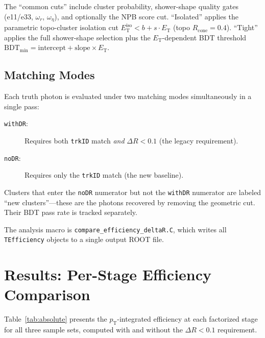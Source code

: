 \documentclass[11pt,letterpaper]{article}
\newcommand{\DR}{\ensuremath{\Delta R}}
\newcommand{\pT}{\ensuremath{p_{\text{T}}}}
\newcommand{\ET}{\ensuremath{E_{\text{T}}}}
\newcommand{\Rcone}{\ensuremath{R_{\text{cone}}}}
\begin{document}
The ``common cuts'' include cluster probability, shower-shape quality gates
(e11/e33, $\omega_r$, $\omega_\eta$), and optionally the NPB score cut.
``Isolated'' applies the parametric topo-cluster isolation cut
$E_\text{T}^\text{iso} < b + s \cdot \ET$ (topo $\Rcone = 0.4$).
``Tight'' applies the full shower-shape selection plus the \ET-dependent BDT
threshold $\text{BDT}_\text{min} = \text{intercept} + \text{slope} \times \ET$.

\subsection{Matching Modes}

Each truth photon is evaluated under two matching modes simultaneously in a
single pass:
\begin{description}
  \item[\texttt{withDR}:] Requires both \texttt{trkID} match \emph{and}
    $\DR < 0.1$ (the legacy requirement).
  \item[\texttt{noDR}:] Requires only the \texttt{trkID} match (the new
    baseline).
\end{description}

Clusters that enter the \texttt{noDR} numerator but not the \texttt{withDR}
numerator are labeled ``new clusters''---these are the photons recovered by
removing the geometric cut. Their BDT pass rate is tracked separately.

The analysis macro is \texttt{compare\_efficiency\_deltaR.C}, which writes all
\texttt{TEfficiency} objects to a single output ROOT file.


\section{Results: Per-Stage Efficiency Comparison}
\label{sec:perstage}

Table~\ref{tab:absolute} presents the \pT-integrated efficiency at each
factorized stage for all three sample sets, computed with and without the
$\DR < 0.1$ requirement.
\end{document}
